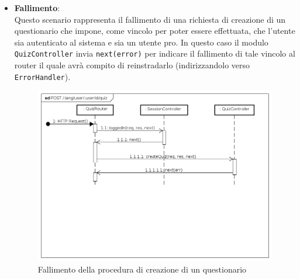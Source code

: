 \begin{itemize}
\item \textbf{Fallimento}:\\
Questo scenario rappresenta il fallimento di una richiesta di creazione di un questionario che impone, come vincolo per poter essere effettuata, che l'utente sia autenticato al sistema e sia un utente pro. In questo caso il modulo \texttt{QuizController} invia \texttt{next(error)} per indicare il fallimento di tale vincolo al router il quale avrà compito di reinstradarlo (indirizzandolo verso \texttt{ErrorHandler}).
\label{Fallimento della procedura di creazione di un questionario}
\begin{figure}[ht]
	\centering
	\includegraphics[scale=0.40]{UML/DiagrammiDiSequenza/Back-end/POST__lang_user_userId_quiz_failure.png}
	\caption{Fallimento della procedura di creazione di un questionario}
\end{figure}
\FloatBarrier
\end{itemize}

